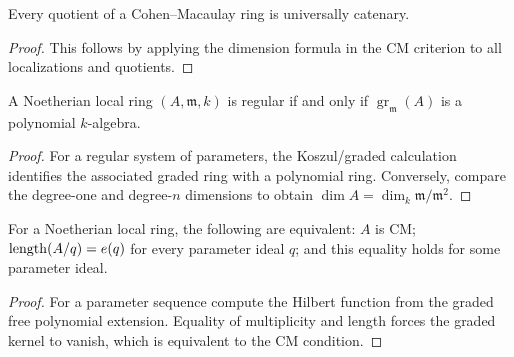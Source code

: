 \begin{theorem}\label{mcrt-thm-17-9}
Every quotient of a Cohen--Macaulay ring is universally catenary.
\end{theorem}
\begin{proof}
This follows by applying the dimension formula in the CM criterion to all
localizations and quotients.
\end{proof}

\begin{theorem}\label{mcrt-thm-17-10}
A Noetherian local ring $(A,\mathfrak m,k)$ is regular if and only if
$\operatorname{gr}_{\mathfrak m}(A)$ is a polynomial $k$-algebra.
\end{theorem}
\begin{proof}
For a regular system of parameters, the Koszul/graded calculation identifies
the associated graded ring with a polynomial ring.  Conversely, compare the
degree-one and degree-$n$ dimensions to obtain
$\dim A=\dim_k\mathfrak m/\mathfrak m^2$.
\end{proof}

\begin{theorem}\label{mcrt-thm-17-11}
For a Noetherian local ring, the following are equivalent: $A$ is CM;
$\operatorname{length}(A/q)=e(q)$ for every parameter ideal $q$; and this equality holds for
some parameter ideal.
\end{theorem}
\begin{proof}
For a parameter sequence compute the Hilbert function from the graded free
polynomial extension.  Equality of multiplicity and length forces the graded
kernel to vanish, which is equivalent to the CM condition.
\end{proof}

